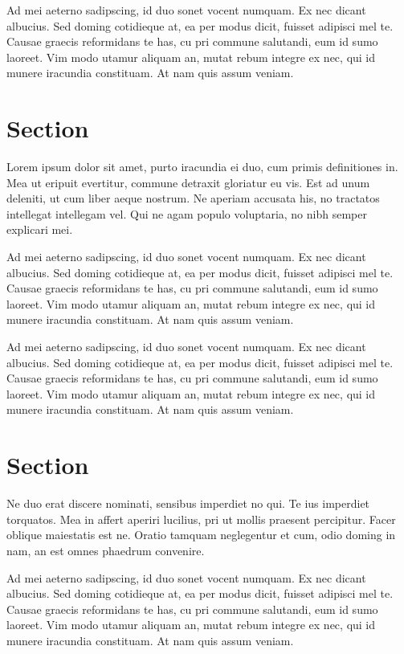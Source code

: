 \documentclass[10pt,a4paper,twocolumn,german]{article}
\begin{document}
	Ad mei aeterno sadipscing, id duo sonet vocent numquam.
	Ex nec dicant albucius. Sed doming cotidieque at, ea per modus dicit, fuisset adipisci mel te.
	Causae graecis reformidans te has, cu pri commune salutandi, eum id sumo laoreet.
	Vim modo utamur aliquam an, mutat rebum integre ex nec, qui id munere iracundia constituam.
	At nam quis assum veniam.	
\section{Section}

	Lorem ipsum dolor sit amet, purto iracundia ei duo, cum primis definitiones in.
	Mea ut eripuit evertitur, commune detraxit gloriatur eu vis.
	Est ad unum deleniti, ut cum liber aeque nostrum.
	Ne aperiam accusata his, no tractatos intellegat intellegam vel.
	Qui ne agam populo voluptaria, no nibh semper explicari mei.
	
	Ad mei aeterno sadipscing, id duo sonet vocent numquam.
	Ex nec dicant albucius. Sed doming cotidieque at, ea per modus dicit, fuisset adipisci mel te.
	Causae graecis reformidans te has, cu pri commune salutandi, eum id sumo laoreet.
	Vim modo utamur aliquam an, mutat rebum integre ex nec, qui id munere iracundia constituam.
	At nam quis assum veniam.	
	
	Ad mei aeterno sadipscing, id duo sonet vocent numquam.
	Ex nec dicant albucius. Sed doming cotidieque at, ea per modus dicit, fuisset adipisci mel te.
	Causae graecis reformidans te has, cu pri commune salutandi, eum id sumo laoreet.
	Vim modo utamur aliquam an, mutat rebum integre ex nec, qui id munere iracundia constituam.
	At nam quis assum veniam.	

\section{Section}

	Ne duo erat discere nominati, sensibus imperdiet no qui.
	Te ius imperdiet torquatos.
	Mea in affert aperiri lucilius, pri ut mollis praesent percipitur.
	Facer oblique maiestatis est ne.
	Oratio tamquam neglegentur et cum, odio doming in nam, an est omnes phaedrum convenire.

	Ad mei aeterno sadipscing, id duo sonet vocent numquam.
	Ex nec dicant albucius. Sed doming cotidieque at, ea per modus dicit, fuisset adipisci mel te.
	Causae graecis reformidans te has, cu pri commune salutandi, eum id sumo laoreet.
	Vim modo utamur aliquam an, mutat rebum integre ex nec, qui id munere iracundia constituam.
	At nam quis assum veniam.	


\end{document}
